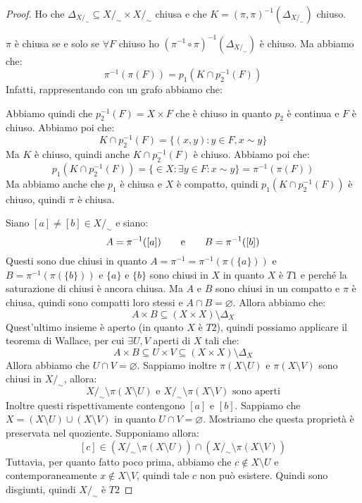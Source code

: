 \documentclass[11pt,a4paper,twoside]{article}
\theoremstyle{definition}
\begin{document}
\begin{proof}
	 Ho che $\Delta_{X/_\sim}\subseteq X/_\sim \times X/_\sim$ chiusa e che $K = (\pi,\pi)^{-1}(\Delta_{X/_\sim})$ chiuso.

	 $\pi$ è chiusa se e solo se $\forall F$ chiuso ho $(\pi^{-1} \circ \pi)^{-1}(\Delta_{X/_\sim})$ è chiuso. Ma abbiamo che:
	\[ \pi^{-1}(\pi(F)) = p_1(K \cap p_2^{-1}(F)) \]
	Infatti, rappresentando con un grafo abbiamo che:
	\begin{center}
	\end{center}
	Abbiamo quindi che $p_2^{-1}(F) = X \times F$ che è chiuso in quanto $p_2$ è continua e $F$ è chiuso. Abbiamo poi che:
	\[ K \cap p_2^{-1}(F) = \{(x,y) : y \in F, x \sim y\} \]
	Ma $K$ è chiuso, quindi anche $K \cap p_2^{-1}(F)$ è chiuso. Abbiamo poi che:
	\[ p_1(K \cap p_2^{-1}(F)) = \{ \in X: \exists y \in F: x \sim y\} = \pi^{-1}(\pi(F)) \]
	Ma abbiamo anche che $p_1$ è chiusa e $X$ è compatto, quindi $p_1(K \cap p_2^{-1}(F))$ è chiuso, quindi $\pi$ è chiusa.

	 Siano $[a]\neq [b] \in X/_\sim$ e siano:
	\[ A = \pi^{-1}([a]) \qquad \text e \qquad B = \pi^{-1}([b]) \]
	Questi sono due chiusi in quanto $A= \pi^{-1} = \pi^{-1}(\pi(\{a\}))$ e $B = \pi^{-1}(\pi(\{b\}))$ e $\{a\}$ e $\{b\}$ sono chiusi in $X$ in quanto $X$ è $T1$ e perché la saturazione di chiusi è ancora chiusa. Ma $A$ e $B$ sono chiusi in un compatto e $\pi$ è chiusa, quindi sono compatti loro stessi e $A \cap B = \varnothing$. Allora abbiamo che:
	\[A \times B \subseteq (X \times X)\setminus \Delta_X\]
	Quest'ultimo insieme è aperto (in quanto $X$ è $T2$), quindi possiamo applicare il teorema di Wallace, per cui $\exists U,V$ aperti di $X$ tali che:
	\[ A \times B \subseteq U \times V \subseteq (X \times X)\setminus \Delta_X \]
	Allora abbiamo che $U \cap V = \varnothing$. Sappiamo inoltre $\pi(X \setminus U)$ e $\pi(X \setminus V)$ sono chiusi in $X/_\sim$, allora:
	\[ X/_\sim \setminus \pi(X \setminus U) \text{ e } X/_\sim \setminus \pi(X \setminus V) \text{ sono aperti}\]
	Inoltre questi rispettivamente contengono $[a]$ e $[b]$. Sappiamo che $X = (X\setminus U) \cup (X \setminus V)$ in quanto $U\cap V = \varnothing$. Mostriamo che questa proprietà è preservata nel quoziente. Supponiamo allora:
	\[ [c] \in (X/_\sim \setminus \pi(X\setminus U)) \cap (X/_\sim \setminus \pi(X \setminus V)) \]
	Tuttavia, per quanto fatto poco prima, abbiamo che $c \not \in X \setminus U$ e contemporaneamente $x \not \in X\setminus V$, quindi tale $c$ non può esistere. Quindi sono disgiunti, quindi $X/_\sim$ è $T2$
\end{proof}
\end{document}
